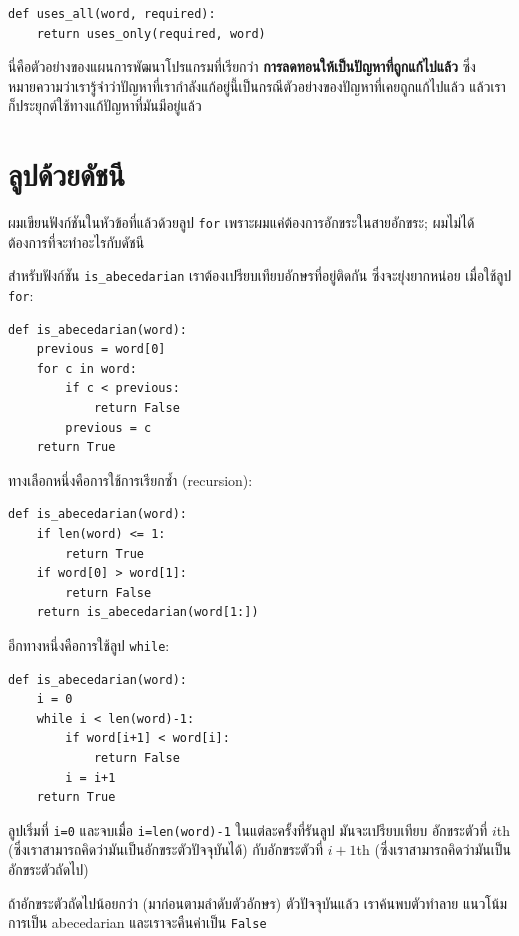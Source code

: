 \begin{verbatim}
def uses_all(word, required):
    return uses_only(required, word)
\end{verbatim}
%
นี่คือตัวอย่างของแผนการพัฒนาโปรแกรมที่เรียกว่า {\bf การลดทอนให้เป็นปัญหาที่ถูกแก้ไปแล้ว}
ซึ่งหมายความว่าเรารู้จำว่าปัญหาที่เรากำลังแก้อยู่นี้เป็นกรณีตัวอย่างของปัญหาที่เคยถูกแก้ไปแล้ว
แล้วเราก็ประยุกต์ใช้ทางแก้ปัญหาที่มันมีอยู่แล้ว



\section{ลูปด้วยดัชนี} %

ผมเขียนฟังก์ชันในหัวข้อที่แล้วด้วยลูป {\tt for} เพราะผมแค่ต้องการอักขระในสายอักขระ;
ผมไม่ได้ต้องการที่จะทำอะไรกับดัชนี

สำหรับฟังก์ชัน \verb"is_abecedarian" เราต้องเปรียบเทียบอักษรที่อยู่ติดกัน ซึ่งจะยุ่งยากหน่อย
เมื่อใช้ลูป {\tt for}:

\begin{verbatim}
def is_abecedarian(word):
    previous = word[0]
    for c in word:
        if c < previous:
            return False
        previous = c
    return True
\end{verbatim}

ทางเลือกหนึ่งคือการใช้การเรียกซ้ำ (recursion):

\begin{verbatim}
def is_abecedarian(word):
    if len(word) <= 1:
        return True
    if word[0] > word[1]:
        return False
    return is_abecedarian(word[1:])
\end{verbatim}

อีกทางหนึ่งคือการใช้ลูป {\tt while}:

\begin{verbatim}
def is_abecedarian(word):
    i = 0
    while i < len(word)-1:
        if word[i+1] < word[i]:
            return False
        i = i+1
    return True
\end{verbatim}
%
ลูปเริ่มที่ {\tt i=0} และจบเมื่อ {\tt i=len(word)-1} ในแต่ละครั้งที่รันลูป มันจะเปรียบเทียบ
อักขระตัวที่ $i$th (ซึ่งเราสามารถคิดว่ามันเป็นอักขระตัวปัจจุบันได้) กับอักขระตัวที่ $i+1$th
(ซึ่งเราสามารถคิดว่ามันเป็นอักขระตัวถัดไป)

ถ้าอักขระตัวถัดไปน้อยกว่า (มาก่อนตามลำดับตัวอักษร) ตัวปัจจุบันแล้ว เราค้นพบตัวทำลาย
แนวโน้มการเป็น abecedarian และเราจะคืนค่าเป็น {\tt False}

